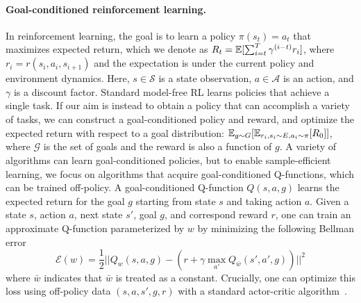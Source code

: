 \documentclass{article}
\begin{document}
\paragraph{Goal-conditioned reinforcement learning.}
In reinforcement learning, the goal is to learn a policy $\pi(s_t) = a_t$ that maximizes expected return, which we denote as \mbox{$R_t = \mathbb{E}[ \sum_{i=t}^T \gamma^{(i - t)} r_i]$}, where $r_i = r(s_i, a_i, s_{i+1})$ and the expectation is under the current policy and environment dynamics.
Here, $s \in \mathcal S$ is a state observation, $a \in \mathcal A$ is an action, and $\gamma$ is a discount factor.
Standard model-free RL learns policies that achieve a single task.
If our aim is instead to obtain a policy that can accomplish a variety of tasks, we can construct a goal-conditioned policy and reward, and optimize the expected return with respect to a goal distribution: $\mathbb{E}_{g \sim G} [\mathbb{E}_{r_i, s_i \sim E, a_i \sim \pi}[R_0]]$, where $\mathcal G$ is the set of goals and the reward is also a function of $g$.
A variety of algorithms can learn goal-conditioned policies, but to enable sample-efficient learning, we focus on algorithms that acquire goal-conditioned Q-functions, which can be trained off-policy.
A goal-conditioned Q-function $Q(s, a, g)$ learns the expected return for the goal $g$ starting from state $s$ and taking action $a$.
Given a state $s$, action $a$, next state $s'$, goal $g$, and correspond reward $r$, one can train an approximate Q-function parameterized by $w$ by minimizing the following Bellman error
\begin{equation}\label{eq:bellman}
   \mathcal E(w) = \frac{1}{2}|| Q_w(s, a, g) - (r +  \gamma \max_{a'} Q_{\bar{w}}(s', a', g))||^2
\end{equation}
where $\bar w$ indicates that $\bar w$ is treated as a constant.
Crucially, one can optimize this loss using off-policy data $(s, a, s', g, r)$ with a standard actor-critic algorithm~\citep{lillicrap2015continuous,fujimoto2018td3,mnih2016asynchronous}.

\vspace{-0.1in}
\end{document}
